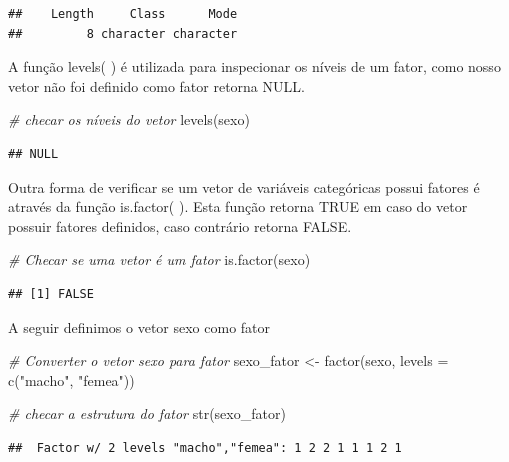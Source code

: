 \documentclass[
]{article}
\newenvironment{Shaded}{\begin{snugshade}}{\end{snugshade}}
\newcommand{\AttributeTok}[1]{\textcolor[rgb]{0.77,0.63,0.00}{#1}}
\newcommand{\CommentTok}[1]{\textcolor[rgb]{0.56,0.35,0.01}{\textit{#1}}}
\newcommand{\FunctionTok}[1]{\textcolor[rgb]{0.00,0.00,0.00}{#1}}
\newcommand{\NormalTok}[1]{#1}
\newcommand{\OtherTok}[1]{\textcolor[rgb]{0.56,0.35,0.01}{#1}}
\newcommand{\StringTok}[1]{\textcolor[rgb]{0.31,0.60,0.02}{#1}}
\begin{document}
\begin{verbatim}
##    Length     Class      Mode 
##         8 character character
\end{verbatim}

A função levels( ) é utilizada para inspecionar os níveis de um fator,
como nosso vetor não foi definido como fator retorna NULL.

\begin{Shaded}
\begin{Highlighting}[]
\CommentTok{\# checar os níveis do vetor}
\FunctionTok{levels}\NormalTok{(sexo)}
\end{Highlighting}
\end{Shaded}

\begin{verbatim}
## NULL
\end{verbatim}

Outra forma de verificar se um vetor de variáveis categóricas possui
fatores é através da função is.factor( ). Esta função retorna TRUE em
caso do vetor possuir fatores definidos, caso contrário retorna FALSE.

\begin{Shaded}
\begin{Highlighting}[]
\CommentTok{\# Checar se uma vetor é um fator}
\FunctionTok{is.factor}\NormalTok{(sexo)}
\end{Highlighting}
\end{Shaded}

\begin{verbatim}
## [1] FALSE
\end{verbatim}

A seguir definimos o vetor sexo como fator

\begin{Shaded}
\begin{Highlighting}[]
\CommentTok{\# Converter o vetor sexo para fator}
\NormalTok{sexo\_fator }\OtherTok{\textless{}{-}} \FunctionTok{factor}\NormalTok{(sexo, }\AttributeTok{levels =} \FunctionTok{c}\NormalTok{(}\StringTok{"macho"}\NormalTok{, }\StringTok{"femea"}\NormalTok{))}

\CommentTok{\# checar a estrutura do fator}
\FunctionTok{str}\NormalTok{(sexo\_fator)}
\end{Highlighting}
\end{Shaded}

\begin{verbatim}
##  Factor w/ 2 levels "macho","femea": 1 2 2 1 1 1 2 1
\end{verbatim}
\end{document}
